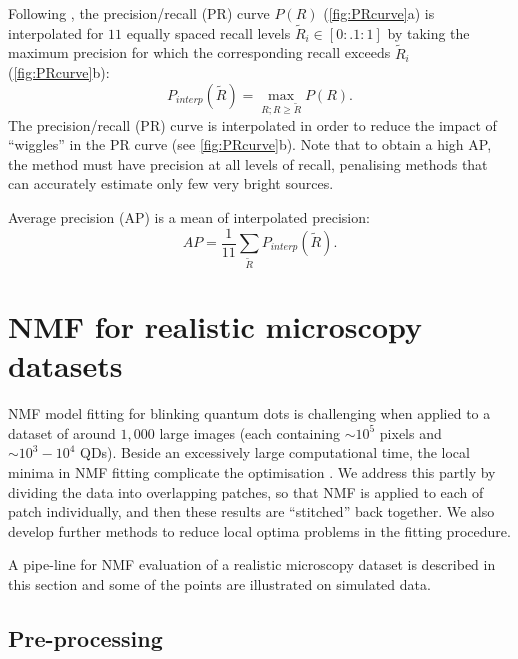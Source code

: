 Following \cite{Everingham2009}, the precision/recall (PR) curve $P(R)$ (\autoref{fig:PRcurve}a) is interpolated for $11$ equally spaced recall levels $\tilde{R}_{i}\in[0:.1:1]$ by taking the maximum precision for which the corresponding recall exceeds $\tilde{R}_{i}$ (\autoref{fig:PRcurve}b):
%
\begin{equation}
	P_{interp}(\tilde{R})=\max_{R;R\geq \tilde{R}}P(R).
\end{equation}
%
The precision/recall (PR) curve is interpolated in order to reduce the impact of ``wiggles'' in the PR curve (see \autoref{fig:PRcurve}b). Note that to obtain a high AP, the method must have precision at all levels of recall, penalising methods that can accurately estimate only few very bright sources. 

Average precision (AP) is a mean of interpolated precision:
%
\begin{equation}
	AP=\frac{1}{11}\sum_{\tilde{R}}{P_{interp}(\tilde{R})}.
	\label{eq:AP}
\end{equation}


\clearpage
\section{NMF for realistic microscopy datasets \label{sec:NMF-for-real}}

NMF model fitting for blinking quantum dots is challenging when applied to a dataset of around $1,000$ large images (each containing $\sim 10^{5}$ pixels and $\sim10^{3}-10^{4}$ QDs). Beside an excessively large computational time, the local minima in NMF fitting complicate the optimisation \cite{Kim2008}. We address this partly by dividing the data into overlapping patches, so that NMF is applied to each of patch individually, and then these results are ``stitched'' back together. We also develop further methods to reduce local optima problems in the fitting procedure. 

A pipe-line for NMF evaluation of a realistic microscopy dataset is described in this section and some of the points are illustrated on simulated data. 


\subsection{Pre-processing \label{sec:preproc}}

